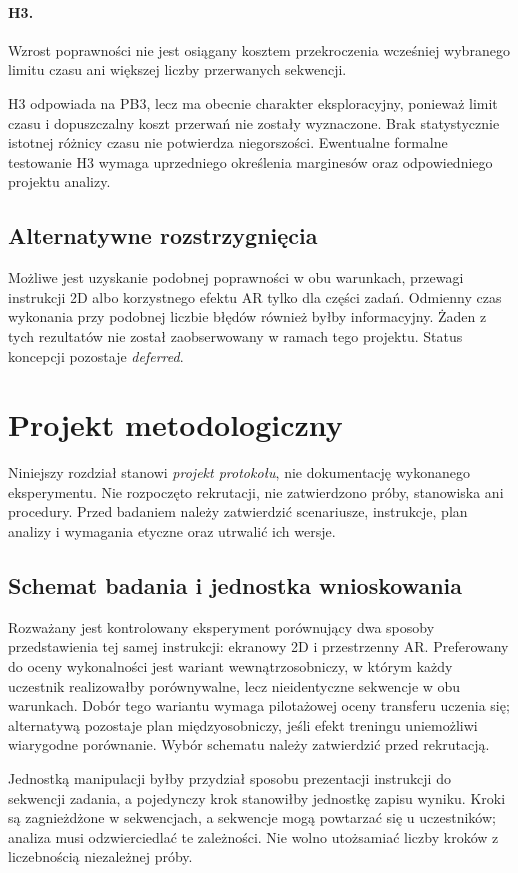 \documentclass[11pt,a4paper]{article}
\begin{document}
\paragraph{H3.} Wzrost poprawności nie jest osiągany kosztem przekroczenia wcześniej wybranego limitu czasu ani większej liczby przerwanych sekwencji.

H3 odpowiada na PB3, lecz ma obecnie charakter eksploracyjny, ponieważ limit czasu i dopuszczalny koszt przerwań nie zostały wyznaczone. Brak statystycznie istotnej różnicy czasu nie potwierdza niegorszości. Ewentualne formalne testowanie H3 wymaga uprzedniego określenia marginesów oraz odpowiedniego projektu analizy.

\subsection{Alternatywne rozstrzygnięcia}
Możliwe jest uzyskanie podobnej poprawności w obu warunkach, przewagi instrukcji 2D albo korzystnego efektu AR tylko dla części zadań. Odmienny czas wykonania przy podobnej liczbie błędów również byłby informacyjny. Żaden z tych rezultatów nie został zaobserwowany w ramach tego projektu. Status koncepcji pozostaje \textit{deferred}.

\section{Projekt metodologiczny}
Niniejszy rozdział stanowi \emph{projekt protokołu}, nie dokumentację wykonanego eksperymentu. Nie rozpoczęto rekrutacji, nie zatwierdzono próby, stanowiska ani procedury. Przed badaniem należy zatwierdzić scenariusze, instrukcje, plan analizy i wymagania etyczne oraz utrwalić ich wersje.

\subsection{Schemat badania i jednostka wnioskowania}
Rozważany jest kontrolowany eksperyment porównujący dwa sposoby przedstawienia tej samej instrukcji: ekranowy 2D i przestrzenny AR. Preferowany do oceny wykonalności jest wariant wewnątrzosobniczy, w którym każdy uczestnik realizowałby porównywalne, lecz nieidentyczne sekwencje w obu warunkach. Dobór tego wariantu wymaga pilotażowej oceny transferu uczenia się; alternatywą pozostaje plan międzyosobniczy, jeśli efekt treningu uniemożliwi wiarygodne porównanie. Wybór schematu należy zatwierdzić przed rekrutacją.

Jednostką manipulacji byłby przydział sposobu prezentacji instrukcji do sekwencji zadania, a pojedynczy krok stanowiłby jednostkę zapisu wyniku. Kroki są zagnieżdżone w sekwencjach, a sekwencje mogą powtarzać się u uczestników; analiza musi odzwierciedlać te zależności. Nie wolno utożsamiać liczby kroków z liczebnością niezależnej próby.
\end{document}
